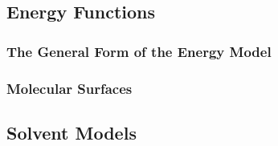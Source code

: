 %    

%    

%    

%    

%    

\subsection{Energy Functions}
\label{subsection:energy_functions}
    \subsubsection{The General Form of the Energy Model}
    \label{subsubsection:energy_general_form}
    

    \subsubsection{Molecular Surfaces}
    \label{subsubsection:molecular_surfaces}
    

\subsection{Solvent Models}
\label{subsubsection:solvent_models}

